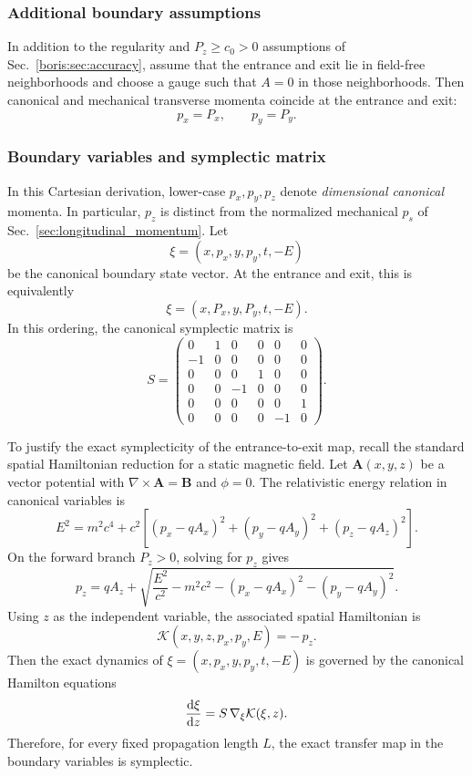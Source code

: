 \subsubsection{Additional boundary assumptions}
In addition to the regularity and \(P_z\ge c_0>0\) assumptions of
Sec.~\ref{boris:sec:accuracy}, assume that the entrance and exit lie in field-free
neighborhoods and choose a gauge such that \(A=0\) in those neighborhoods.
Then canonical and mechanical transverse momenta coincide at the entrance and
exit:
\[
p_x = P_x,\qquad p_y = P_y.
\]

\subsubsection{Boundary variables and symplectic matrix}
In this Cartesian derivation, lower-case $p_x,p_y,p_z$ denote
\emph{dimensional canonical} momenta. In particular, $p_z$ is distinct
from the normalized mechanical $p_s$ of
Sec.~\ref{sec:longitudinal_momentum}.
Let
\[
\xi = (x,p_x,y,p_y,t,-E)
\]
be the canonical boundary state vector.
At the entrance and exit, this is equivalently
\[
\xi = (x,P_x,y,P_y,t,-E).
\]
In this ordering, the canonical symplectic matrix is
\[
S =
\begin{pmatrix}
0 & 1 & 0 & 0 & 0 & 0\\
-1 & 0 & 0 & 0 & 0 & 0\\
0 & 0 & 0 & 1 & 0 & 0\\
0 & 0 & -1 & 0 & 0 & 0\\
0 & 0 & 0 & 0 & 0 & 1\\
0 & 0 & 0 & 0 & -1 & 0
\end{pmatrix}.
\]

To justify the exact symplecticity of the entrance-to-exit map, recall the
standard spatial Hamiltonian reduction for a static magnetic field.
Let \(\bm A(x,y,z)\) be a vector potential with \(\nabla\times\bm A=\bm B\) and
\(\phi=0\).
The relativistic energy relation in canonical variables is
\[
E^2
=
m^2c^4
+ c^2\!\left[(p_x-qA_x)^2+(p_y-qA_y)^2+(p_z-qA_z)^2\right].
\]
On the forward branch \(P_z>0\), solving for \(p_z\) gives
\[
p_z
=
qA_z
+ \sqrt{\frac{E^2}{c^2}-m^2c^2-(p_x-qA_x)^2-(p_y-qA_y)^2}.
\]
Using \(z\) as the independent variable, the associated spatial Hamiltonian is
\[
\mathcal K(x,y,z,p_x,p_y,E)
= -\,p_z.
\]
Then the exact dynamics of
\(\xi=(x,p_x,y,p_y,t,-E)\) is governed by the canonical Hamilton equations
\[
\frac{\text{d} {\xi}}{\text{d} {z}} = S\,\nabla_\xi \mathcal K(\xi,z).
\]
Therefore, for every fixed propagation length \(L\), the exact transfer map in
the boundary variables is symplectic.

